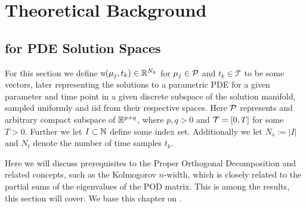 \chapter{Theoretical Background}


\section{for PDE Solution Spaces} \label{section: background for PDE solutions}


For this section we define $u(\mu_j, t_k) \in \mathbb{R}^{N_h}$ for $\mu_j \in \mathcal{P}$ and $t_k \in \mathcal{T}$ to be some vectors, later representing the solutions to a parametric PDE for a given parameter and time point in a given discrete subspace of the solution manifold, sampled uniformly and iid from their respective spaces. Here $\mathcal{P}$ represents and arbitrary compact subspace of $\mathbb{R}^{p + q}$, where $p, q > 0$ and $\mathcal{T} = [0, T]$ for some $T > 0$. Further we let $I \subset \mathbb{N}$ define some index set. Additionally we let $N_s := \vert I \vert$ and $N_t$ denote the number of time samples $t_k$.

Here we will discuss prerequisites to the Proper Orthogonal Decomposition and related concepts, such as the Kolmogorov $n$-width, which is closely related to the partial sums of the eigenvalues of the POD matrix. This is among the results, this section will cover. We base this chapter on \cite{quarteroni2015rb}.

